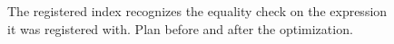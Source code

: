 \begin{figure}[htpb]
    \begin{subfigure}[c]{248pt}
        \centering
    \end{subfigure}\hfill\begin{subfigure}[c]{160pt}
        \centering
    \end{subfigure}
    
    \caption{The registered index recognizes the equality check on the expression it was registered with. Plan before and after the optimization.}
    \label{fig:tree-index-scan}
\end{figure}

